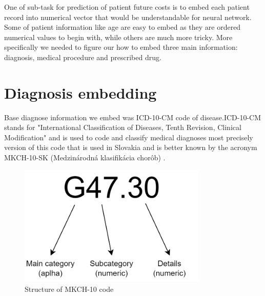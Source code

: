 
One of sub-task for prediction of patient future costs is to embed each patient record into numerical vector that would be understandable for neural network. Some of patient information like age are easy to embed as they are ordered numerical values to begin with, while others are much more tricky. More specifically we needed to figure our how to embed three main information: diagnosis, medical procedure and prescribed drug.

\section{Diagnosis embedding}

Base diagnose information we embed was ICD-10-CM code of disease.ICD-10-CM stands for "International Classification of Diseases, Tenth Revision, Clinical Modification" and is used to code and classify medical diagnoses \cite{cdcICD10CM} most precisely version of this code that is used in Slovakia and is better known by the acronym MKCH-10-SK (Medzinárodná klasifikácia chorôb) \cite{ncziMKCH}.\\

\begin{figure}[!h]
	\centering
	
	\includegraphics[width=0.8\textwidth]{images/ICD-10-CM.png}
	
	\caption{Structure of MKCH-10 code}
	\label{fig:icd-10-cm}
\end{figure}

